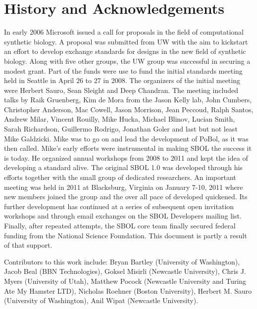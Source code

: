 \section{History and Acknowledgements}

In early 2006 Microsoft issued a call for proposals in the field of computational synthetic biology. A proposal was submitted from UW with the aim to kickstart an effort to develop exchange standards for designs in the new field of synthetic biology. Along with five other groups, the UW group was successful in securing a modest grant. Part of the funds were use to fund the initial standards meeting held in Seattle in April 26 to 27 in 2008. The organizers of the initial meeting were Herbert Sauro, Sean Sleight and Deep Chandran. The meeting included talks by Raik Gruenberg,  Kim de Mora from the Jason Kelly lab, John Cumbers,  Christopher Anderson, Mac Cowell, Jason Morrison, Jean Peccoud, Ralph Santos, Andrew Milar, Vincent Rouilly, Mike Hucka, Michael Blinov, Lucian Smith, Sarah Richardson, Guillermo Rodrigo, Jonathan Goler and last but not least Mike Galdzicki. Mike was to go on and lead the development of PoBol, as it was then called. Mike's early efforts were instrumental in making SBOL the success it is today. He organized annual workshops from 2008 to 2011 and kept the idea of developing a standard alive. The original SBOL 1.0 was developed through his efforts together with the small group of dedicated researchers. An important meeting was held in 2011 at Blacksburg, Virginia on January 7-10, 2011 where new members joined the group and the over all pace of developed quickened. Its further development has continued at a series of subsequent open invitation workshops and through email exchanges on the SBOL Developers mailing list. Finally, after repeated attempts, the SBOL core team finally secured federal funding from the National Science Foundation. This document is partly a result of that support.  



Contributors to this work include: Bryan Bartley (University of Washington), Jacob Beal (BBN Technologies), Goksel Misirli (Newcastle University), Chris J. Myers (University of Utah), Matthew Pocock (Newcastle University and Turing Ate My Hamster LTD), Nicholas Roehner (Boston University), Herbert M. Sauro (University of Washington), Anil Wipat (Newcastle University).

